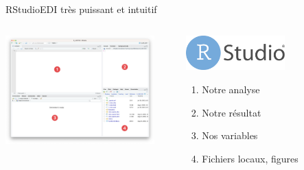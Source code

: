 \documentclass[xcolor=dvipsnames, onlymath, 10pt, aspectratio=169, handout]{beamer}
\begin{document}
\begin{frame}{RStudio}{EDI très puissant et intuitif}

	\begin{columns}[c]
		\begin{column}{0.7\textwidth}
			\begin{center}
				\includegraphics[width = 0.9\textwidth]{rstudio.png}
			\end{center}
		\end{column}
		\begin{column}{0.3\textwidth}
			\includegraphics[width = 0.6\textwidth]{rstudio_logo.png}
			\begin{enumerate}
				\item Notre analyse
				\item Notre résultat
				\item Nos variables
				\item Fichiers locaux, figures
			\end{enumerate}
		\end{column}
	\end{columns}


\end{frame}


\end{document}
